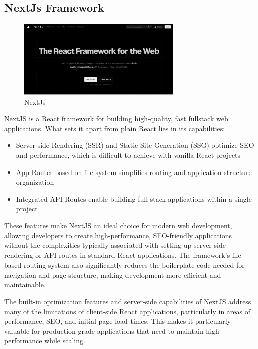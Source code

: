 \subsection{NextJs Framework}
\begin{figure}[H]
    \centering
    \includegraphics[width=0.7\textwidth]{root/react.png}
    \caption{NextJs}
\end{figure}
NextJS\cite{nextjs-docs} is a React framework for building high-quality, fast fullstack web applications. What sets it apart from plain React lies in its capabilities:

\begin{itemize}
\item Server-side Rendering (SSR) and Static Site Generation (SSG) optimize SEO and performance, which is difficult to achieve with vanilla React projects
\item App Router based on file system simplifies routing and application structure organization
\item Integrated API Routes enable building full-stack applications within a single project
\end{itemize}

These features make NextJS an ideal choice for modern web development, allowing developers to create high-performance, SEO-friendly applications without the complexities typically associated with setting up server-side rendering or API routes in standard React applications. The framework's file-based routing system also significantly reduces the boilerplate code needed for navigation and page structure, making development more efficient and maintainable.

The built-in optimization features and server-side capabilities of NextJS address many of the limitations of client-side React applications, particularly in areas of performance, SEO, and initial page load times. This makes it particularly valuable for production-grade applications that need to maintain high performance while scaling.
